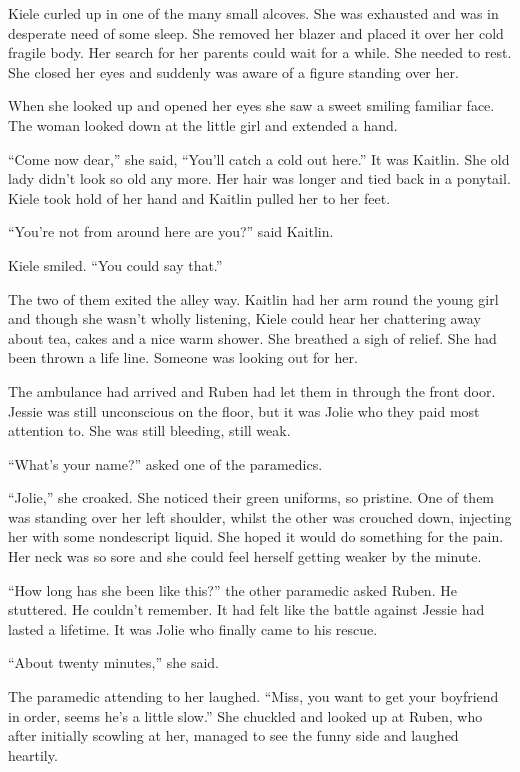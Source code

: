 Kiele curled up in one of the many small alcoves.  She was exhausted and was in desperate need of some sleep.  She removed her blazer and placed it over her cold fragile body.  Her search for her parents could wait for a while.  She needed to rest.  She closed her eyes and suddenly was aware of a figure standing over her.

When she looked up and opened her eyes she saw a sweet smiling familiar face.  The woman looked down at the little girl and extended a hand.  

``Come now dear,'' she said, ``You'll catch a cold out here.''  It was Kaitlin.  She old lady didn't look so old any more.  Her hair was longer and tied back in a ponytail.  Kiele took hold of her hand and Kaitlin pulled her to her feet.

``You're not from around here are you?'' said Kaitlin.

Kiele smiled.  ``You could say that.''

The two of them exited the alley way.  Kaitlin had her arm round the young girl and though she wasn't wholly listening, Kiele could hear her chattering away about tea, cakes and a nice warm shower.  She breathed a sigh of relief.  She had been thrown a life line.  Someone was looking out for her.



\thoughtbreak



The ambulance had arrived and Ruben had let them in through the front door.  Jessie was still unconscious on the floor, but it was Jolie who they paid most attention to.  She was still bleeding, still weak.

``What's your name?'' asked one of the paramedics.

``Jolie,'' she croaked.  She noticed their green uniforms, so pristine.  One of them was standing over her left shoulder, whilst the other was crouched down, injecting her with some nondescript liquid.  She hoped it would do something for the pain.  Her neck was so sore and she could feel herself getting weaker by the minute.  

``How long has she been like this?'' the other paramedic asked Ruben.  He stuttered.  He couldn't remember.  It had felt like the battle against Jessie had lasted a lifetime.  It was Jolie who finally came to his rescue.

``About twenty minutes,'' she said.

The paramedic attending to her laughed.  ``Miss, you want to get your boyfriend in order, seems he's a little slow.''  She chuckled and looked up at Ruben, who after initially scowling at her, managed to see the funny side and laughed heartily.  

